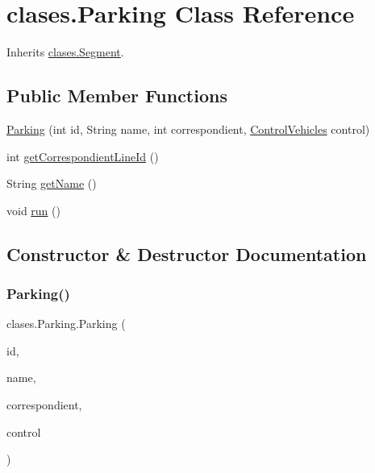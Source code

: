 \hypertarget{classclases_1_1_parking}{}\section{clases.\+Parking Class Reference}
\label{classclases_1_1_parking}


Inherits \mbox{\hyperlink{classclases_1_1_segment}{clases.\+Segment}}.

\subsection*{Public Member Functions}
\begin{DoxyCompactItemize}
\item 
\mbox{\hyperlink{classclases_1_1_parking_aed5b077a48389218d8cb53cd7e23d075}{Parking}} (int id, String name, int correspondient, \mbox{\hyperlink{classcontrol_1_1_control_vehicles}{Control\+Vehicles}} control)
\item 
int \mbox{\hyperlink{classclases_1_1_parking_a03f52670aae58fe1af947e75cc8ca318}{get\+Correspondient\+Line\+Id}} ()
\item 
String \mbox{\hyperlink{classclases_1_1_parking_adcdc236dec3311a9830a411a3cbbc448}{get\+Name}} ()
\item 
void \mbox{\hyperlink{classclases_1_1_parking_a6caa7f58e50c46346ae1233f1988c84d}{run}} ()
\end{DoxyCompactItemize}


\subsection{Constructor \& Destructor Documentation}
\mbox{\label{classclases_1_1_parking_aed5b077a48389218d8cb53cd7e23d075}} 
\subsubsection{\texorpdfstring{Parking()}{Parking()}}
{\footnotesize\ttfamily clases.\+Parking.\+Parking (\begin{DoxyParamCaption}\item[{int}]{id,  }\item[{String}]{name,  }\item[{int}]{correspondient,  }\item[{\mbox{\hyperlink{classcontrol_1_1_control_vehicles}{Control\+Vehicles}}}]{control }\end{DoxyParamCaption})}



